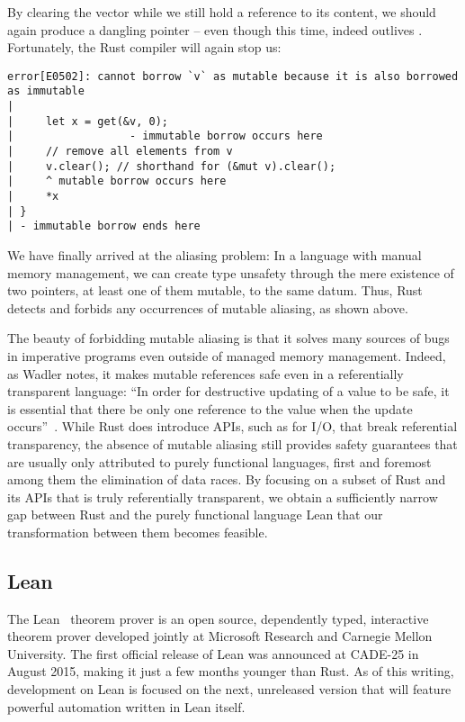 By clearing the vector while we still hold a reference to its content, we should
again produce a dangling pointer -- even though this time,  indeed
outlives . Fortunately, the Rust compiler will again stop us:

\begin{verbatim}
error[E0502]: cannot borrow `v` as mutable because it is also borrowed as immutable
|
|     let x = get(&v, 0);
|                  - immutable borrow occurs here
|     // remove all elements from v
|     v.clear(); // shorthand for (&mut v).clear();
|     ^ mutable borrow occurs here
|     *x
| }
| - immutable borrow ends here
\end{verbatim}

We have finally arrived at the aliasing problem: In a language with manual
memory management, we can create type unsafety through the mere existence of two
pointers, at least one of them mutable, to the same datum. Thus, Rust detects
and forbids any occurrences of mutable aliasing, as shown above.

The beauty of forbidding mutable aliasing is that it solves many sources of bugs
in imperative programs even outside of managed memory management. Indeed, as
Wadler notes, it makes mutable references safe even in a referentially
transparent language: ``In order for destructive updating of a value to be safe,
it is essential that there be only one reference to the value when the update
occurs''~\cite{wadler1990linear}. While Rust does introduce APIs, such as for I/O, that break referential
transparency, the absence of mutable aliasing still provides safety guarantees
that are usually only attributed to purely functional languages, first and
foremost among them the elimination of data races. By focusing on a subset of
Rust and its APIs that is truly referentially transparent, we obtain a
sufficiently narrow gap between Rust and the purely functional language Lean
that our transformation between them becomes feasible.

\subsection{Lean}

The Lean~\cite{de2015lean} theorem prover is an open source, dependently typed,
interactive theorem prover developed jointly at Microsoft Research and Carnegie
Mellon University. The first official release of Lean was announced at CADE-25
in August 2015, making it just a few months younger than Rust. As of this
writing, development on Lean is focused on the next, unreleased version that
will feature powerful automation written in Lean itself.

